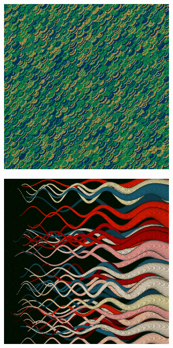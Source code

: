 \documentclass[11pt,twoside]{book}
\begin{document}
\newpage
{}
\fancyfoot[CE,CO]{\fontsize{10}{12}\selectfont \thepage}
\begin{figure}[!ht]
\includegraphics[width=246pt]{oz-48181b9b-be9a-4c11-b281-49495de4d7e5.png}
\end{figure}
\newpage
{}
\fancyfoot[CE,CO]{\fontsize{10}{12}\selectfont \thepage}
\begin{figure}[!ht]
\includegraphics[width=246pt]{constructivist-59a43a95-05c5-47a2-a9a7-87ece977aab0.png}
\end{figure}
\newpage
{}
\fancyfoot[CE,CO]{\fontsize{10}{12}\selectfont \thepage}
\end{document}
